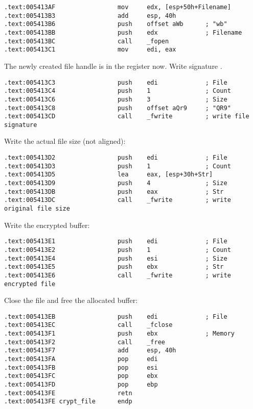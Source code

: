 \begin{lstlisting}[style=customasmx86]
.text:005413AF                 mov     edx, [esp+50h+Filename]
.text:005413B3                 add     esp, 40h
.text:005413B6                 push    offset aWb      ; "wb"
.text:005413BB                 push    edx             ; Filename
.text:005413BC                 call    _fopen
.text:005413C1                 mov     edi, eax
\end{lstlisting}

The newly created file handle is in the \EDI register now. Write signature .

\begin{lstlisting}[style=customasmx86]
.text:005413C3                 push    edi             ; File
.text:005413C4                 push    1               ; Count
.text:005413C6                 push    3               ; Size
.text:005413C8                 push    offset aQr9     ; "QR9"
.text:005413CD                 call    _fwrite         ; write file signature
\end{lstlisting}

Write the actual file size (not aligned):

\begin{lstlisting}[style=customasmx86]
.text:005413D2                 push    edi             ; File
.text:005413D3                 push    1               ; Count
.text:005413D5                 lea     eax, [esp+30h+Str]
.text:005413D9                 push    4               ; Size
.text:005413DB                 push    eax             ; Str
.text:005413DC                 call    _fwrite         ; write original file size
\end{lstlisting}

Write the encrypted buffer:

\begin{lstlisting}[style=customasmx86]
.text:005413E1                 push    edi             ; File
.text:005413E2                 push    1               ; Count
.text:005413E4                 push    esi             ; Size
.text:005413E5                 push    ebx             ; Str
.text:005413E6                 call    _fwrite         ; write encrypted file
\end{lstlisting}

Close the file and free the allocated buffer:

\begin{lstlisting}[style=customasmx86]
.text:005413EB                 push    edi             ; File
.text:005413EC                 call    _fclose
.text:005413F1                 push    ebx             ; Memory
.text:005413F2                 call    _free
.text:005413F7                 add     esp, 40h
.text:005413FA                 pop     edi
.text:005413FB                 pop     esi
.text:005413FC                 pop     ebx
.text:005413FD                 pop     ebp
.text:005413FE                 retn
.text:005413FE crypt_file      endp
\end{lstlisting}

